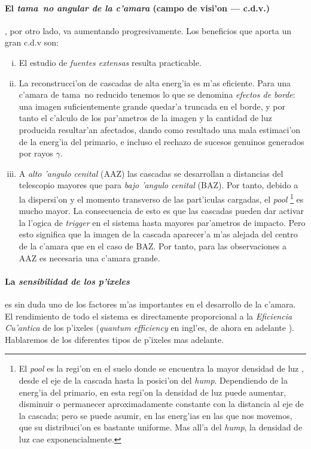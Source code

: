 \paragraph{El \emph{tama~no angular de la c'amara} (campo de visi'on 
  --- c.d.v.)}, por otro lado, va aumentando progresivamente. Los
beneficios que aporta un gran c.d.v son:
%
\begin{enumerate}[i)]
\item El estudio de \emph{fuentes extensas} resulta practicable.
%
\item La reconstrucci'on de cascadas de alta energ'ia es m'as
  eficiente. Para una c'amara de tama~no reducido tenemos lo que se
  denomina \emph{efectos de borde}: una imagen suficientemente grande
  quedar'a truncada en el borde, y por tanto el c'alculo de los
  par'ametros de la imagen y la cantidad de luz producida resultar'an
  afectados, dando como resultado una mala estimaci'on de la energ'ia
  del primario, e incluso el rechazo de sucesos genuinos generados por
  rayos $\gamma$.
%
\item A \emph{alto 'angulo cenital} (AAZ) las cascadas se desarrollan
  a distancias del telescopio mayores que para \emph{bajo 'angulo
    cenital} (BAZ). Por tanto, debido a la dispersi'on y el momento
  transverso de las part'iculas cargadas, el \emph{pool}
  \Cherenkov\footnote{El \emph{pool} \Cherenkov es la regi'on en el
    suelo donde se encuentra la mayor densidad de luz \Cherenkov,
    desde el eje de la cascada hasta la posici'on del \emph{hump}.
    Dependiendo de la energ'ia del primario, en esta regi'on la
    densidad de luz puede aumentar, disminuir o permanecer
    aproximadamente constante con la distancia al eje de la cascada;
    pero se puede asumir, en las energ'ias en las que nos movemos, que
    su distribuci'on es bastante uniforme. Mas all'a del \emph{hump},
    la densidad de luz cae exponencialmente.} es mucho mayor. La
  consecuencia de esto es que las cascadas pueden dar activar la
  l'ogica de \emph{trigger} en el sistema hasta mayores par'ametros de
  impacto. Pero esto significa que la imagen de la cascada aparecer'a
  m'as alejada del centro de la c'amara que en el caso de BAZ. Por
  tanto, para las observaciones a AAZ es necesaria una c'amara grande.
\end{enumerate}

\paragraph{La \emph{sensibilidad de los p'ixeles}} es sin duda uno de
los factores m'as importantes en el desarrollo de la c'amara. El
rendimiento de todo el sistema es directamente proporcional a la
\emph{Eficiencia Cu'antica} de los p'ixeles (\emph{quantum efficiency}
en ingl'es, de ahora en adelante \QE). Hablaremos de los diferentes
tipos de p'ixeles mas adelante.

